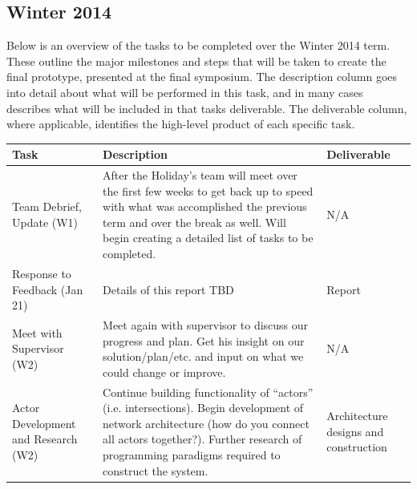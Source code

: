 \documentclass{report}
\begin{document}
\begin{longtable}[htbp] {| P{2.5cm} | P{10cm} | P{2.5cm} |}
\end{longtable}

\subsection{Winter 2014}
Below is an overview of the tasks to be completed over the Winter 2014 term.
These outline the major milestones and steps that will be taken to create the final prototype, presented at the final symposium.
The description column goes into detail about what will be performed in this task, and in many cases describes what will be included in that tasks deliverable.
The deliverable column, where applicable, identifies the high-level product of each specific task.\\

\begin{longtable}{|p{4.5cm}|p{6cm}|p{4.5cm}|} \hline
    Task                                              & Description                                                                                                & Deliverable                           \\ \hline
    Team Debrief, Update (W1)                         & After the Holiday's team will meet over the first few weeks to get back up to speed with what was accomplished the previous term and over the break as well. Will begin creating a detailed list of tasks to be completed.         & N/A                                   \\ \hline
    Response to Feedback (Jan 21)                     & Details of this report TBD                                                                                                                                                                                                         & Report                                \\ \hline
    Meet with Supervisor (W2)                         & Meet again with supervisor to discuss our progress and plan. Get his insight on our solution/plan/etc. and input on what we could change or improve.                                                                               & N/A                                   \\ \hline
    Actor Development and Research (W2)               & Continue building functionality of ``actors'' (i.e. intersections). Begin development of network architecture (how do you connect all actors together?). Further research of programming paradigms required to construct the system. & Architecture designs and construction \\ \hline

\end{longtable}
\end{document}
